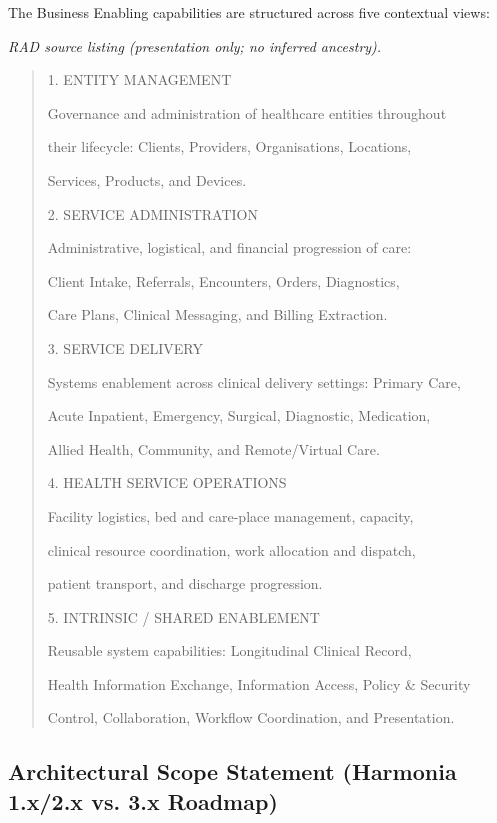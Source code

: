 The Business Enabling capabilities are structured across five contextual views:

\label{rad:enabling:28}

\textit{RAD source listing (presentation only; no inferred ancestry).}
\begin{quote}
1. ENTITY MANAGEMENT

Governance and administration of healthcare entities throughout

their lifecycle: Clients, Providers, Organisations, Locations,

Services, Products, and Devices.

2. SERVICE ADMINISTRATION

Administrative, logistical, and financial progression of care:

Client Intake, Referrals, Encounters, Orders, Diagnostics,

Care Plans, Clinical Messaging, and Billing Extraction.

3. SERVICE DELIVERY

Systems enablement across clinical delivery settings: Primary Care,

Acute Inpatient, Emergency, Surgical, Diagnostic, Medication,

Allied Health, Community, and Remote/Virtual Care.

4. HEALTH SERVICE OPERATIONS

Facility logistics, bed and care-place management, capacity,

clinical resource coordination, work allocation and dispatch,

patient transport, and discharge progression.

5. INTRINSIC / SHARED ENABLEMENT

Reusable system capabilities: Longitudinal Clinical Record,

Health Information Exchange, Information Access, Policy \& Security

Control, Collaboration, Workflow Coordination, and Presentation.
\end{quote}
\label{rad:enabling:57}

\par\smallskip
{}\label{rad:enabling:59}
\subsection*{Architectural Scope Statement (Harmonia 1.x/\allowbreak{}2.x vs. 3.x Roadmap)}
\label{rad:enabling:61}

